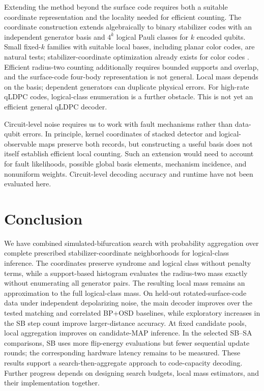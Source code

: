 \documentclass[aps,prapplied,reprint,superscriptaddress,amsmath,amssymb,floatfix,nofootinbib]{revtex4-2}
\begin{document}
Extending the method beyond the surface code requires both a suitable
coordinate representation and the locality needed for efficient
counting. The coordinate construction extends algebraically to binary
stabilizer codes with an independent generator basis and \(4^k\) logical
Pauli classes for \(k\) encoded qubits. Small fixed-\(k\) families with
suitable local bases, including planar color codes, are natural tests;
stabilizer-coordinate optimization already exists for color codes
\cite{ref16}. Efficient radius-two counting additionally requires bounded
supports and overlap, and the surface-code four-body representation is
not general. Local mass depends on the basis; dependent generators can
duplicate physical errors. For high-rate qLDPC codes, logical-class
enumeration is a further obstacle. This is not yet an efficient general
qLDPC decoder.

Circuit-level noise requires us to work with fault mechanisms rather
than data-qubit errors. In principle, kernel coordinates of stacked
detector and logical-observable maps preserve both records, but
constructing a useful basis does not itself establish efficient local
counting. Such an extension would need to account for fault likelihoods,
possible global basis elements, mechanism incidence, and nonuniform
weights. Circuit-level decoding accuracy and runtime have not been
evaluated here.

\section{Conclusion}\label{vi.-conclusion}

We have combined simulated-bifurcation search with probability
aggregation over complete prescribed stabilizer-coordinate neighborhoods
for logical-class inference. The coordinates preserve syndrome and
logical class without penalty terms, while a support-based histogram
evaluates the radius-two mass exactly without enumerating all generator
pairs. The resulting local mass remains an approximation to the full
logical-class mass. On held-out rotated-surface-code data under
independent depolarizing noise, the main decoder improves over the
tested matching and correlated BP+OSD baselines, while exploratory
increases in the SB step count improve larger-distance accuracy. At
fixed candidate pools, local aggregation improves on candidate-MAP
inference. In the selected SB--SA comparisons, SB uses more flip-energy
evaluations but fewer sequential update rounds; the corresponding
hardware latency remains to be measured. These results support a
search-then-aggregate approach to code-capacity decoding. Further
progress depends on designing search budgets, local mass estimators, and
their implementation together.
\end{document}
